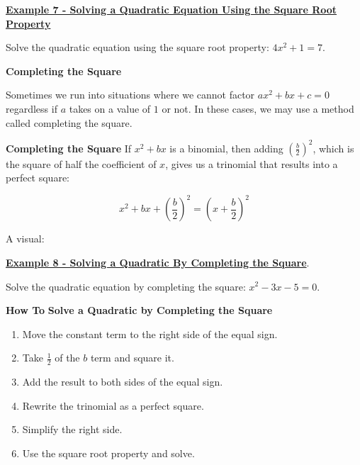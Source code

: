 \documentclass[12pt]{book}
\begin{document}
 \underline{\textbf{Example 7 - Solving a Quadratic Equation Using the Square Root Property}}

Solve the quadratic equation using the square root property: $4x^2+1=7$.

\vspace{25mm}
{\large \textbf{Completing the Square}}

Sometimes we run into situations where we cannot factor $ax^2 +bx+c =0$ regardless if $a$ takes on a value of $1$ or not. In these cases, we may use a method called completing the square.

\begin{boxR}
    \textbf{Completing the Square}
    \vspace{1mm}
     \hline
    \vspace{2mm}
    If $x^2+bx$ is a binomial, then adding $\left(\frac{b}{2}\right)^2$, which is the square of half the coefficient of $x$, gives us a trinomial that results into a perfect square: 

    $$ x^2 +bx + \left(\frac{b}{2}\right)^2 = \left(x+\frac{b}{2}\right)^2$$
\end{boxR}
A visual: 

\vspace{45mm}
 \underline{\textbf{Example 8 - Solving a Quadratic By Completing the Square}}.

Solve the quadratic equation by completing the square: $x^2-3x-5=0$. 

\newpage

\begin{boxR}
    \textbf{How To}
    \vspace{1mm}
     \hline
    \vspace{2mm}
    \textbf{Solve a Quadratic by Completing the Square}

    \begin{enumerate}
        \item Move the constant term to the right side of the equal sign.
        \item Take $\frac{1}{2}$ of the $b$ term and square it. 
        \item Add the result to both sides of the equal sign. 
        \item Rewrite the trinomial as a perfect square. 
        \item Simplify the right side. 
        \item Use the square root property and solve.
    \end{enumerate}
\end{boxR}
\vspace{3mm}
\end{document}
